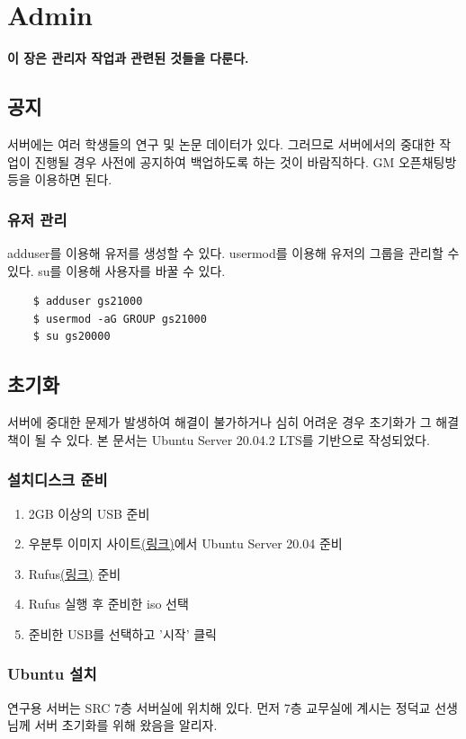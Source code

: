 \graphicspath{{./chap6/images/}}  
\chapter{Admin}
\textbf{이 장은 관리자 작업과 관련된 것들을 다룬다.}

\section{공지}
서버에는 여러 학생들의 연구 및 논문 데이터가 있다. 그러므로 서버에서의 중대한 작업이 진행될 경우 사전에 공지하여 백업하도록 하는 것이 바람직하다. GM 오픈채팅방 등을 이용하면 된다.
\subsection{유저 관리}
adduser를 이용해 유저를 생성할 수 있다. usermod를 이용해 유저의 그룹을 관리할 수 있다. su를 이용해 사용자를 바꿀 수 있다.
    \begin{lstlisting}
    $ adduser gs21000
    $ usermod -aG GROUP gs21000
    $ su gs20000
    \end{lstlisting}
\section{초기화}
서버에 중대한 문제가 발생하여 해결이 불가하거나 심히 어려운 경우 초기화가 그 해결책이 될 수 있다. 본 문서는 Ubuntu Server 20.04.2 LTS를 기반으로 작성되었다.
\subsection{설치디스크 준비}
\begin{enumerate}
    \item 2GB 이상의 USB 준비
    \item 우분투 이미지 사이트\href{https://releases.ubuntu.com/20.04/}{(링크)}에서 Ubuntu Server 20.04 준비
    \item Rufus\href{https://rufus.ie/}{(링크)} 준비
    \item Rufus 실행 후 준비한 iso 선택
    \item 준비한 USB를 선택하고 '시작' 클릭
\end{enumerate}
\subsection{Ubuntu 설치}
연구용 서버는 SRC 7층 서버실에 위치해 있다. 먼저 7층 교무실에 계시는 정덕교 선생님께 서버 초기화를 위해 왔음을 알리자.

